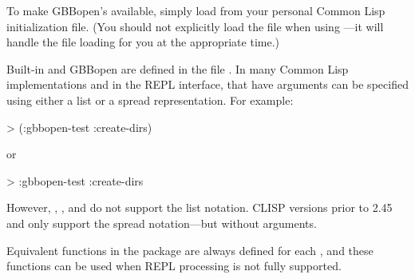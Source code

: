 \documentclass[10pt,twoside,english,pdftex]{article}
\begin{document}
To make GBBopen's  available, simply load
 from your personal Common
Lisp initialization file.  (You should not explicitly load the
 file when using
---it will handle the
 file loading for you at the
appropriate time.)

Built-in and GBBopen  are defined in the file
.  In many Common Lisp
implementations and in the
 REPL interface,
 that have arguments can be specified using either a list
or a spread representation.  For example:
%
\W\supp
\begin{example}
  > (:gbbopen-test :create-dirs)
\end{example}
%
or
%
\W\supp\notpretop
\begin{example}
  > :gbbopen-test :create-dirs
\end{example}
%
However, ,
, and
 do not support the list
notation.  CLISP versions prior to 2.45 and
 only support the spread
notation---but without arguments.

Equivalent functions in the  package are always
defined for each , and these functions can be used when
REPL  processing is not fully supported.
\end{document}
